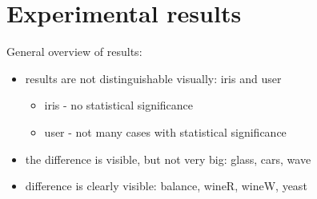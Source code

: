 \section{Experimental results}
\label{sec:experiments}

General overview of results: 
\begin{itemize}
    \item results are not distinguishable visually: iris and user
    \begin{itemize}
        \item iris - no statistical significance
        \item user - not many cases with statistical significance
    \end{itemize}
    \item the difference is visible, but not very big: glass, cars, wave
    \item difference is clearly visible: balance, wineR, wineW, yeast
\end{itemize}


















